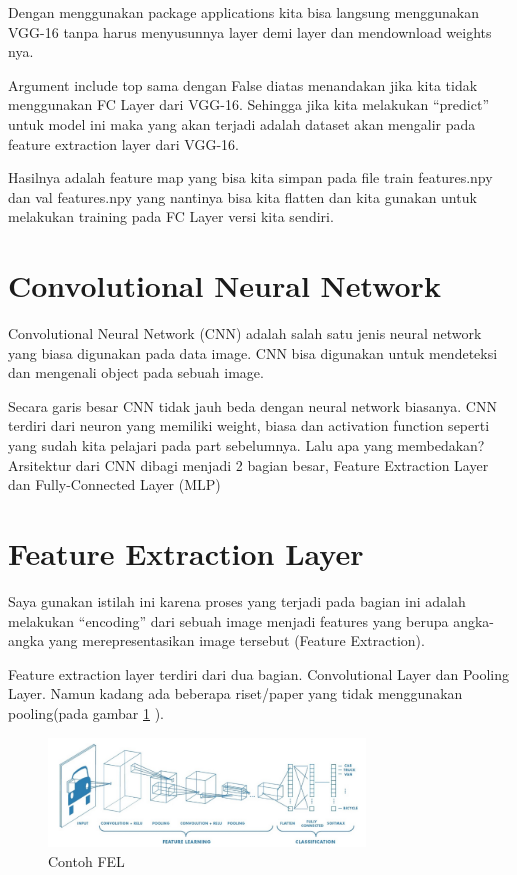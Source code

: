 Dengan menggunakan package applications kita bisa langsung menggunakan VGG-16 tanpa harus menyusunnya layer demi layer dan mendownload weights nya.

Argument include top sama dengan False diatas menandakan jika kita tidak menggunakan FC Layer dari VGG-16. Sehingga jika kita melakukan “predict” untuk model ini maka yang akan terjadi adalah dataset akan mengalir pada feature extraction layer dari VGG-16. 

Hasilnya adalah feature map yang bisa kita simpan pada file train features.npy dan val features.npy yang nantinya bisa kita flatten dan kita gunakan untuk melakukan training pada FC Layer versi kita sendiri.

\section{Convolutional Neural Network}
Convolutional Neural Network (CNN) adalah salah satu jenis neural network yang biasa digunakan pada data image. CNN bisa digunakan untuk mendeteksi dan mengenali object pada sebuah image.

Secara garis besar CNN tidak jauh beda dengan neural network biasanya. CNN terdiri dari neuron yang memiliki weight, biasa dan activation function seperti yang sudah kita pelajari pada part sebelumnya. Lalu apa yang membedakan? Arsitektur dari CNN dibagi menjadi 2 bagian besar, Feature Extraction Layer dan Fully-Connected Layer (MLP) 

\section{Feature Extraction Layer}
Saya gunakan istilah ini karena proses yang terjadi pada bagian ini adalah melakukan “encoding” dari sebuah image menjadi features yang berupa angka-angka yang merepresentasikan image tersebut (Feature Extraction).

Feature extraction layer terdiri dari dua bagian. Convolutional Layer dan Pooling Layer. Namun kadang ada beberapa riset/paper yang tidak menggunakan pooling(pada gambar \ref{labelgambar1} ).
\begin{figure}[!htp]
	\includegraphics[width=0.75\textwidth]{figures/FeatureExtractionLayer.PNG}
	\caption{Contoh FEL}
	\label{labelgambar1}
\end{figure}

